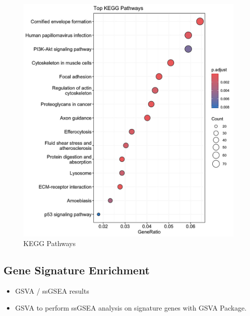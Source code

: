 \documentclass[
]{article}
\begin{document}
\begin{figure}

{\centering \includegraphics[width=0.8\linewidth]{Images/KEGG_pathways} 

}

\caption{KEGG Pathways}\label{fig:unnamed-chunk-31}
\end{figure}

\newpage

\subsection{Gene Signature Enrichment}\label{gene-signature-enrichment}

\begin{itemize}
\item
  GSVA / ssGSEA results
\item
  GSVA to perform ssGSEA analysis on signature genes with GSVA Package.
\end{itemize}
\end{document}
